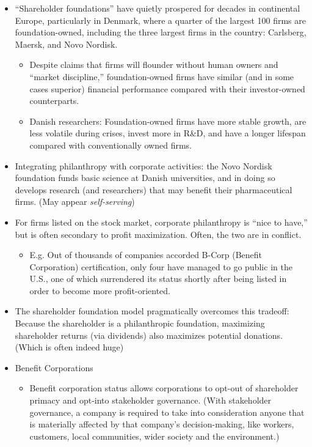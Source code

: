 \documentclass[oneside]{book}
\begin{document}
\begin{enumerate}
\begin{itemize}
\begin{itemize}
\begin{enumerate}
            \end{enumerate}
            \item ``Shareholder foundations'' have quietly prospered for decades in continental Europe, particularly in Denmark, where a quarter of the largest 100 firms are foundation-owned, including the three largest firms in the country: Carlsberg, Maersk, and Novo Nordisk.
            \begin{itemize}
                \item Despite claims that firms will flounder without human owners and “market discipline,” foundation-owned firms have similar (and in some cases superior) financial performance compared with their investor-owned counterparts. 
                \item Danish researchers: Foundation-owned firms have more stable growth, are less volatile during crises, invest more in R\&D, and have a longer lifespan compared with conventionally owned firms.  
            \end{itemize}
            \item Integrating philanthropy with corporate activities: the Novo Nordisk foundation funds basic science at Danish universities, and in doing so develops research (and researchers) that may benefit their pharmaceutical firms. (May appear \emph{self-serving})
            \item For firms listed on the stock market, corporate philanthropy is ``nice to have,'' but is often secondary to profit maximization. Often, the two are in conflict.
            \begin{itemize}
                \item E.g. Out of thousands of companies accorded B-Corp (Benefit Corporation) certification, only four have managed to go public in the U.S., one of which surrendered its status shortly after being listed in order to become more profit-oriented.
            \end{itemize}
            \item The shareholder foundation model pragmatically overcomes this tradeoff: Because the shareholder is a philanthropic foundation, maximizing shareholder returns (via dividends) also maximizes potential donations. (Which is often indeed huge)
            \item Benefit Corporations
            \begin{itemize}
                \item Benefit corporation status allows corporations to opt-out of shareholder primacy and opt-into stakeholder governance. (With stakeholder governance, a company is required to take into consideration anyone that is materially affected by that company's decision-making, like workers, customers, local communities, wider society and the environment.)

\end{itemize}
\end{itemize}
\end{itemize}
\end{enumerate}
\end{document}
